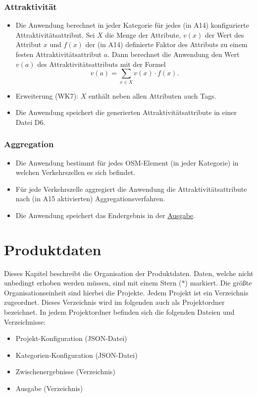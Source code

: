 \documentclass[parskip=full]{scrartcl} %
\begin{document}
\subsubsection*{Attraktivität}
\begin{itemize}
    \item Die Anwendung berechnet in jeder Kategorie für jedes (in A14) konfigurierte Attraktivitätsattribut. Sei $X$ die Menge der Attribute, $v(x)$ der Wert des Attribut $x$ und $f(x)$ der (in A14) definierte Faktor des Attributs zu einem festen Attraktivitätsattribut $a$. Dann berechnet die Anwendung den Wert $v(a)$ des Attraktivitätsattributs mit der Formel $$v(a)=\sum_{x\in X}{v(x)\cdot f(x)}.$$
    \item Erweiterung (WK7): $X$ enthält neben allen Attributen auch Tags.
    \item Die Anwendung speichert die generierten Attraktivitätsattribute in einer Datei D6.
\end{itemize}

\subsubsection*{Aggregation}
\begin{itemize}
    \item Die Anwendung bestimmt für jedes OSM-Element (in jeder Kategorie) in welchen Verkehrszellen es sich befindet.
    \item Für jede Verkehrszelle aggregiert die Anwendung die Attraktivitätsattribute nach (in A15 aktivierten) Aggregationsverfahren.
    \item Die Anwendung speichert das Endergebnis in der \hyperlink{finalresult}{Ausgabe}.
\end{itemize}
\newpage





\section{Produktdaten} \hypertarget{data}{}
Dieses Kapitel beschreibt die Organisation der Produktdaten. Daten, welche nicht unbedingt erhoben werden müssen, sind mit einem Stern ($\ast$) markiert. Die größte Organisationseinheit sind hierbei die Projekte. Jedem Projekt ist ein Verzeichnis zugeordnet. Dieses Verzeichnis wird im folgenden auch als Projektordner bezeichnet. In jedem Projektordner befinden sich die folgenden Dateien und Verzeichnisse:
\begin{itemize}
    \item Projekt-Konfiguration (JSON-Datei)
    \item Kategorien-Konfiguration (JSON-Datei)
    \item Zwischenergebnisse (Verzeichnis)
    \item Ausgabe (Verzeichnis)
\end{itemize}
\end{document}
